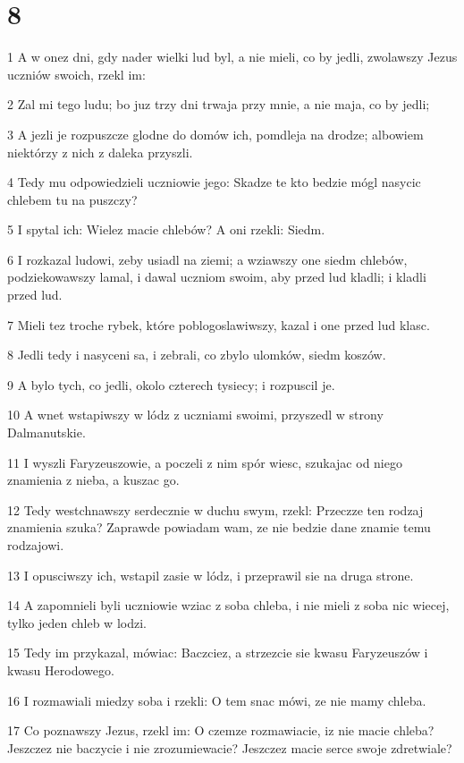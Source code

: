 \chapter{8}

\par 1 A w onez dni, gdy nader wielki lud byl, a nie mieli, co by jedli, zwolawszy Jezus uczniów swoich, rzekl im:
\par 2 Zal mi tego ludu; bo juz trzy dni trwaja przy mnie, a nie maja, co by jedli;
\par 3 A jezli je rozpuszcze glodne do domów ich, pomdleja na drodze; albowiem niektórzy z nich z daleka przyszli.
\par 4 Tedy mu odpowiedzieli uczniowie jego: Skadze te kto bedzie mógl nasycic chlebem tu na puszczy?
\par 5 I spytal ich: Wielez macie chlebów? A oni rzekli: Siedm.
\par 6 I rozkazal ludowi, zeby usiadl na ziemi; a wziawszy one siedm chlebów, podziekowawszy lamal, i dawal uczniom swoim, aby przed lud kladli; i kladli przed lud.
\par 7 Mieli tez troche rybek, które poblogoslawiwszy, kazal i one przed lud klasc.
\par 8 Jedli tedy i nasyceni sa, i zebrali, co zbylo ulomków, siedm koszów.
\par 9 A bylo tych, co jedli, okolo czterech tysiecy; i rozpuscil je.
\par 10 A wnet wstapiwszy w lódz z uczniami swoimi, przyszedl w strony Dalmanutskie.
\par 11 I wyszli Faryzeuszowie, a poczeli z nim spór wiesc, szukajac od niego znamienia z nieba, a kuszac go.
\par 12 Tedy westchnawszy serdecznie w duchu swym, rzekl: Przeczze ten rodzaj znamienia szuka? Zaprawde powiadam wam, ze nie bedzie dane znamie temu rodzajowi.
\par 13 I opusciwszy ich, wstapil zasie w lódz, i przeprawil sie na druga strone.
\par 14 A zapomnieli byli uczniowie wziac z soba chleba, i nie mieli z soba nic wiecej, tylko jeden chleb w lodzi.
\par 15 Tedy im przykazal, mówiac: Baczciez, a strzezcie sie kwasu Faryzeuszów i kwasu Herodowego.
\par 16 I rozmawiali miedzy soba i rzekli: O tem snac mówi, ze nie mamy chleba.
\par 17 Co poznawszy Jezus, rzekl im: O czemze rozmawiacie, iz nie macie chleba? Jeszczez nie baczycie i nie zrozumiewacie? Jeszczez macie serce swoje zdretwiale?
